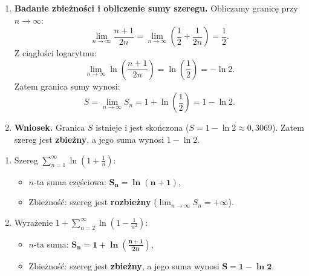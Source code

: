\begin{enumerate}[label=\textbf{Krok \arabic*.},leftmargin=*]
    \item \textbf{Badanie zbieżności i obliczenie sumy szeregu.}
    Obliczamy granicę przy $n \to \infty$:
    \begin{equation*}
        \lim_{n \to \infty} \frac{n+1}{2n} = \lim_{n \to \infty} \left(\frac{1}{2} + \frac{1}{2n}\right) = \frac{1}{2}.
    \end{equation*}
    Z ciągłości logarytmu:
    \begin{equation*}
        \lim_{n \to \infty} \ln\left(\frac{n+1}{2n}\right) = \ln\left(\frac{1}{2}\right) = -\ln 2.
    \end{equation*}
    Zatem granica sumy wynosi:
    \begin{equation*}
        S = \lim_{n \to \infty} S_n = 1 + \ln\left(\frac{1}{2}\right) = 1 - \ln 2.
    \end{equation*}

    \item \textbf{Wniosek.}
    Granica $S$ istnieje i jest skończona ($S = 1 - \ln 2 \approx 0{,}3069$). Zatem szereg jest \textbf{zbieżny}, a jego suma wynosi $1 - \ln 2$.
\end{enumerate}

\vspace{0.2cm}

\begin{odpowiedzbox}
\begin{enumerate}[label=(\alph*),leftmargin=2em]
    \item Szereg $\displaystyle\sum_{n=1}^{\infty} \ln\left(1 + \frac{1}{n}\right)$:
    \begin{itemize}
        \item $n$-ta suma częściowa: $\mathbf{S_n = \ln(n+1)}$,
        \item Zbieżność: szereg jest \textbf{rozbieżny} ($\lim_{n\to\infty} S_n = +\infty$).
    \end{itemize}
    \item Wyrażenie $\displaystyle 1 + \sum_{n=2}^{\infty} \ln\left(1 - \frac{1}{n^2}\right)$:
    \begin{itemize}
        \item $n$-ta suma: $\mathbf{S_n = 1 + \ln\left(\frac{n+1}{2n}\right)}$,
        \item Zbieżność: szereg jest \textbf{zbieżny}, a jego suma wynosi $\mathbf{S = 1 - \ln 2}$.
    \end{itemize}
\end{enumerate}
\end{odpowiedzbox}
